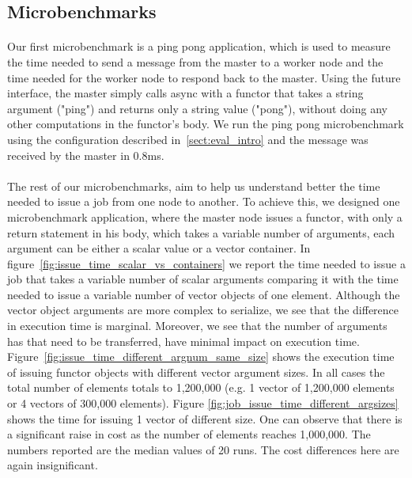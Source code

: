 \subsection{Microbenchmarks}
\label{sect:microbenchmark}
\paragraph{}
	Our first microbenchmark is a ping pong application, which is used to measure the time needed to send a 
message from the master to a worker node and the time needed for the worker node to respond back to the master.
Using the future interface, the master simply calls async with a functor that takes a string argument ("ping") 
and returns only a string value ("pong"), without doing any other computations in the functor's body.  We run
the ping pong microbenchmark using the configuration described in~\ref{sect:eval_intro} and the message was 
received by the master in 0.8ms.

\paragraph{}
	The rest of our microbenchmarks, aim to help us understand better the time needed to issue a job from one
node to another.  To achieve this, we designed one microbenchmark application, where the master node issues
a functor, with only a return statement in his body, which takes a variable number of arguments, each argument
can be either a scalar value or a vector container.  In figure~\ref{fig:issue_time_scalar_vs_containers} we report
the time needed to issue a job that takes a variable number of scalar arguments comparing it with the time needed
to issue a variable number of vector objects of one element.  Although the vector object arguments are more complex
to serialize, we see that the difference in execution time is marginal.  Moreover, we see that the number of arguments
has that need to be transferred, have minimal impact on execution time.  
Figure~\ref{fig:issue_time_different_argnum_same_size} shows the execution time of issuing functor objects with different
vector argument sizes.  In all cases the total number of elements totals to 1,200,000 (e.g. 1 vector of 1,200,000 elements or
4 vectors of 300,000 elements).   Figure \ref{fig:job_issue_time_different_argsizes} shows the time for issuing 1 vector 
of different size.  One can observe that there is a significant raise in cost as the number of elements reaches 1,000,000.
The numbers reported are the median values of 20 runs.  The cost differences here are 
again insignificant. 

